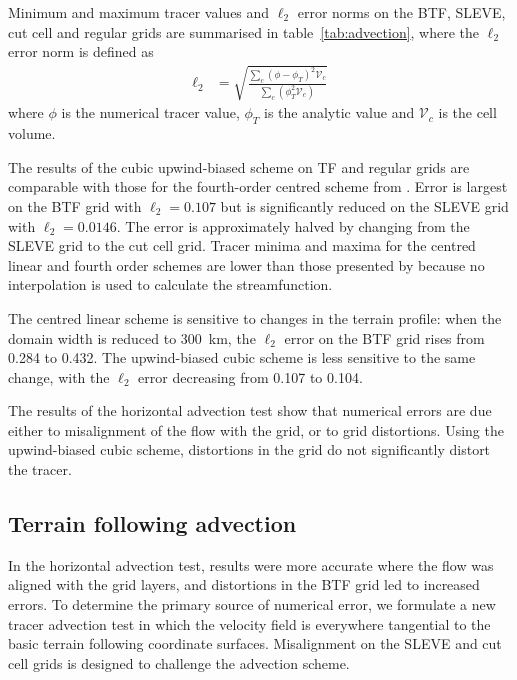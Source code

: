 \documentclass{ametsoc}
\begin{document}
Minimum and maximum tracer values and \(\ell_2\) error norms on the BTF, SLEVE, cut cell and regular grids are summarised in table~\ref{tab:advection}, where the \(\ell_2\) error norm is defined as 
\begin{align}
	\ell_2 &= \sqrt{\frac{\sum_c \left( \phi - \phi_{T} \right)^2 \mathcal{V}_c}{\sum_c \left( \phi_T^2 \mathcal{V}_c \right)}} \label{eqn:l2-error}
\end{align}
where $\phi$ is the numerical tracer value, $\phi_T$ is the analytic value and $\mathcal{V}_c$ is the cell volume.

The results of the cubic upwind-biased scheme on TF and regular grids are comparable with those for the fourth-order centred scheme from \citet{schaer2002}.  Error is largest on the BTF grid with \(\ell_2 = \num{0.107}\) but is significantly reduced on the SLEVE grid with \(\ell_2 = \num{0.0146}\).  The error is approximately halved by changing from the SLEVE grid to the cut cell grid.
Tracer minima and maxima for the centred linear and fourth order schemes are lower than those presented by \citet{schaer2002} because no interpolation is used to calculate the streamfunction.

The centred linear scheme is sensitive to changes in the terrain profile: when the domain width is reduced to \SI{300}{\kilo\meter}, the $\ell_2$ error on the BTF grid rises from \num{0.284} to \num{0.432}.  The upwind-biased cubic scheme is less sensitive to the same change, with the $\ell_2$ error decreasing from \num{0.107} to \num{0.104}.

The results of the horizontal advection test show that numerical errors are due either to misalignment of the flow with the grid, or to grid distortions.  Using the upwind-biased cubic scheme, distortions in the grid do not significantly distort the tracer.



\subsection{Terrain following advection}
In the horizontal advection test, results were more accurate where the flow was aligned with the grid layers, and distortions in the BTF grid led to increased errors.  To determine the primary source of numerical error, we formulate a new tracer advection test in which the velocity field is everywhere tangential to the basic terrain following coordinate surfaces.  Misalignment on the SLEVE and cut cell grids is designed to challenge the advection scheme.
\end{document}

